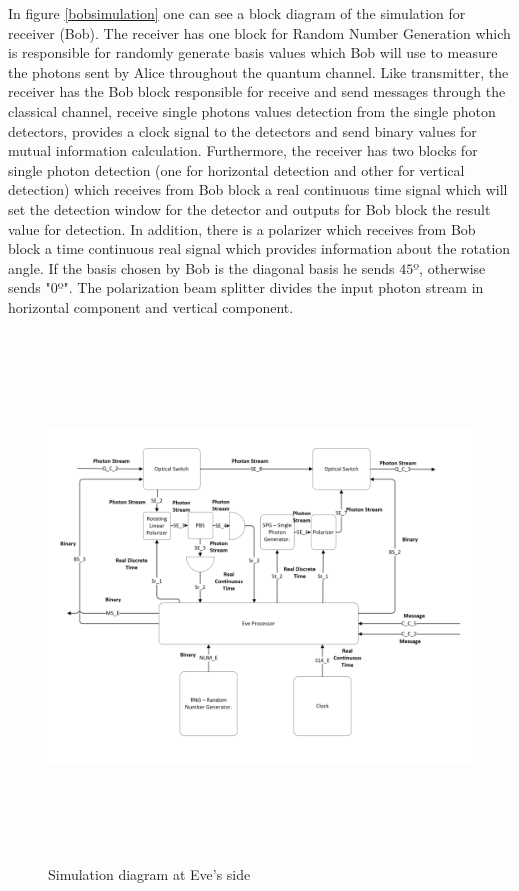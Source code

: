      In figure \ref{bobsimulation} one can see a block diagram of the simulation for receiver (Bob). The receiver has one block for Random Number Generation which is responsible for randomly generate basis values which Bob will use to measure the photons sent by Alice throughout the quantum channel. Like transmitter, the receiver has the Bob block responsible for receive and send messages through the classical channel, receive single photons values detection from the single photon detectors, provides a clock signal to the detectors and send binary values for mutual information calculation. Furthermore, the receiver has two blocks for single photon detection (one for horizontal detection and other for vertical detection) which receives from Bob block a real continuous time signal which will set the detection window for the detector and outputs for Bob block the result value for detection. In addition, there is a polarizer which receives from Bob block a time continuous real signal which provides information about the rotation angle. If the basis chosen by Bob is the diagonal basis he sends $45º$, otherwise sends "0º". The polarization beam splitter divides the input photon stream in horizontal component and vertical component.
     



\begin{figure}[h]
	\centering
	\includegraphics[width=1.1\textwidth, height=14cm]{./sdf/bb84_with_discrete_variables/figures/eve_simulation.png}
	\caption{Simulation diagram at Eve's side}\label{evesimulation}
\end{figure}

